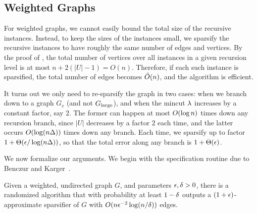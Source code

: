 \subsection{Weighted Graphs}


For weighted graphs, we cannot easily bound the total size of the recursive instances. Instead, to keep the sizes of the instances small, we sparsify the recursive instances to have roughly the same number of edges and vertices. By the proof of , the total number of vertices over all instances in a given recursion level is at most $n+2(|U|-1)=O(n)$. Therefore, if each such instance is sparsified, the total number of edges becomes $\tilde{O}(n)$, and the algorithm is efficient.

It turns out we only need to re-sparsify the graph in two cases: when we branch down to a graph $G_v$ (and not $G_{\textup{large}}$), and when the mincut $\lambda$ increases by a constant factor, say $2$. The former can happen at most $O(\log n)$ times down any recursion branch, since $|U|$ decreases by a factor $2$ each time, and the latter occurs $O(\log(n\Delta))$ times down any branch. Each time, we sparsify up to factor $1+\Theta(\epsilon/\log(n\Delta))$, so that the total error along any branch is $1+\Theta(\epsilon)$. 

We now formalize our arguments. We begin with the specification routine due to Benczur and Karger~\cite{BenczurKarger1996}.

\BT{}
Given a weighted, undirected graph $G$, and parameters $\epsilon,\delta>0$, there is a randomized algorithm that with probability at least $1-\delta$ outputs a $(1+\epsilon)$-approximate sparsifier of $G$ with $O(n\epsilon^{-2}\log(n/\delta))$ edges. %
\ET

